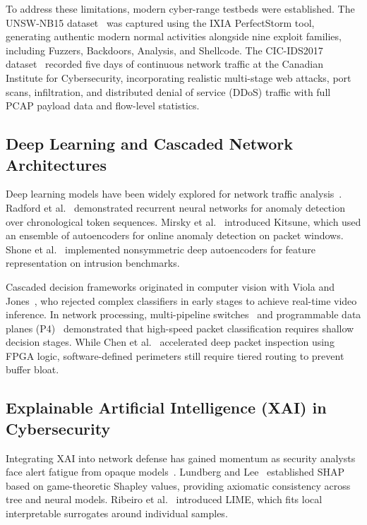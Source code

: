 \documentclass[conference]{IEEEtran}
\begin{document}
To address these limitations, modern cyber-range testbeds were established. The UNSW-NB15 dataset~\cite{moustafa2015unsw} was captured using the IXIA PerfectStorm tool, generating authentic modern normal activities alongside nine exploit families, including Fuzzers, Backdoors, Analysis, and Shellcode. The CIC-IDS2017 dataset~\cite{sharafaldin2018cicids} recorded five days of continuous network traffic at the Canadian Institute for Cybersecurity, incorporating realistic multi-stage web attacks, port scans, infiltration, and distributed denial of service (DDoS) traffic with full PCAP payload data and flow-level statistics.

\subsection{Deep Learning and Cascaded Network Architectures}
Deep learning models have been widely explored for network traffic analysis~\cite{ferrag2020deep, vinayakumar2019deep}. Radford et al.~\cite{radford2018network} demonstrated recurrent neural networks for anomaly detection over chronological token sequences. Mirsky et al.~\cite{mirsky2018kitsune} introduced Kitsune, which used an ensemble of autoencoders for online anomaly detection on packet windows. Shone et al.~\cite{shone2018deep} implemented nonsymmetric deep autoencoders for feature representation on intrusion benchmarks.

Cascaded decision frameworks originated in computer vision with Viola and Jones~\cite{viola2001rapid}, who rejected complex classifiers in early stages to achieve real-time video inference. In network processing, multi-pipeline switches~\cite{wang2018line} and programmable data planes (P4)~\cite{bosshart2014p4, shahbaz2016pisces} demonstrated that high-speed packet classification requires shallow decision stages. While Chen et al.~\cite{chen2020line} accelerated deep packet inspection using FPGA logic, software-defined perimeters still require tiered routing to prevent buffer bloat.

\subsection{Explainable Artificial Intelligence (XAI) in Cybersecurity}
Integrating XAI into network defense has gained momentum as security analysts face alert fatigue from opaque models~\cite{wang2020interpretability, mahbooba2021xai}. Lundberg and Lee~\cite{lundberg2017unified} established SHAP based on game-theoretic Shapley values, providing axiomatic consistency across tree and neural models. Ribeiro et al.~\cite{ribeiro2016why} introduced LIME, which fits local interpretable surrogates around individual samples.
\end{document}
